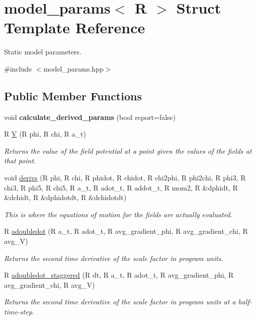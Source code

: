 \hypertarget{structmodel__params}{
\section{model\_\-params$<$ R $>$ Struct Template Reference}
\label{structmodel__params}
}


Static model parameters.  


{\ttfamily \#include $<$model\_\-params.hpp$>$}\subsection*{Public Member Functions}
\begin{DoxyCompactItemize}
\item 
\hypertarget{structmodel__params_a9bcd0871ce87aa307d0df35b7e073d72}{
void {\bfseries calculate\_\-derived\_\-params} (bool report=false)}
\label{structmodel__params_a9bcd0871ce87aa307d0df35b7e073d72}

\item 
R \hyperlink{structmodel__params_a2ca88aaf39658ce4bbe31cf92654040b}{V} (R phi, R chi, R a\_\-t)
\begin{DoxyCompactList}\small\item\em Returns the value of the field potential at a point given the values of the fields at that point. \item\end{DoxyCompactList}\item 
void \hyperlink{structmodel__params_a62e7a6b400316ea05112fa84110eb632}{derivs} (R phi, R chi, R phidot, R chidot, R chi2phi, R phi2chi, R phi3, R chi3, R phi5, R chi5, R a\_\-t, R adot\_\-t, R addot\_\-t, R mom2, R \&dphidt, R \&dchidt, R \&dphidotdt, R \&dchidotdt)
\begin{DoxyCompactList}\small\item\em This is where the equations of motion for the fields are actually evaluated. \item\end{DoxyCompactList}\item 
R \hyperlink{structmodel__params_ad35516eb94a6c0dc6d5372d1376f1980}{adoubledot} (R a\_\-t, R adot\_\-t, R avg\_\-gradient\_\-phi, R avg\_\-gradient\_\-chi, R avg\_\-V)
\begin{DoxyCompactList}\small\item\em Returns the second time derivative of the scale factor in program units. \item\end{DoxyCompactList}\item 
R \hyperlink{structmodel__params_ac95d2efa5a5b568aea61917b3765544c}{adoubledot\_\-staggered} (R dt, R a\_\-t, R adot\_\-t, R avg\_\-gradient\_\-phi, R avg\_\-gradient\_\-chi, R avg\_\-V)
\begin{DoxyCompactList}\small\item\em Returns the second time derivative of the scale factor in program units at a half-\/time-\/step. \item\end{DoxyCompactList}\end{DoxyCompactItemize}
